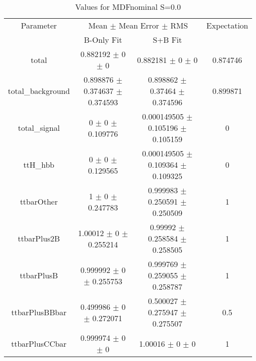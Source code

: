 \begin{table}
\centering
\caption{Values for MDFnominal S=0.0}
\begin{tabular}{cccc}
\toprule
Parameter & \multicolumn{2}{c}{Mean $\pm$ Mean Error $\pm$ RMS} & Expectation\\
 & B-Only Fit & S+B Fit & \\
\midrule
total & \num{0.882192} $\pm$ \num{0} $\pm$ \num{0} & \num{0.882181} $\pm$ \num{0} $\pm$ \num{0} & \num{0.874746}\\
total\_background & \num{0.898876} $\pm$ \num{0.374637} $\pm$ \num{0.374593} & \num{0.898862} $\pm$ \num{0.37464} $\pm$ \num{0.374596} & \num{0.899871}\\
total\_signal & \num{0} $\pm$ \num{0} $\pm$ \num{0.109776} & \num{0.000149505} $\pm$ \num{0.105196} $\pm$ \num{0.105159} & \num{0}\\
ttH\_hbb & \num{0} $\pm$ \num{0} $\pm$ \num{0.129565} & \num{0.000149505} $\pm$ \num{0.109364} $\pm$ \num{0.109325} & \num{0}\\
ttbarOther & \num{1} $\pm$ \num{0} $\pm$ \num{0.247783} & \num{0.999983} $\pm$ \num{0.250591} $\pm$ \num{0.250509} & \num{1}\\
ttbarPlus2B & \num{1.00012} $\pm$ \num{0} $\pm$ \num{0.255214} & \num{0.99992} $\pm$ \num{0.258584} $\pm$ \num{0.258505} & \num{1}\\
ttbarPlusB & \num{0.999992} $\pm$ \num{0} $\pm$ \num{0.255753} & \num{0.999769} $\pm$ \num{0.259055} $\pm$ \num{0.258787} & \num{1}\\
ttbarPlusBBbar & \num{0.499986} $\pm$ \num{0} $\pm$ \num{0.272071} & \num{0.500027} $\pm$ \num{0.275947} $\pm$ \num{0.275507} & \num{0.5}\\
ttbarPlusCCbar & \num{0.999974} $\pm$ \num{0} $\pm$ \num{0} & \num{1.00016} $\pm$ \num{0} $\pm$ \num{0} & \num{1}\\
\bottomrule
\end{tabular}
\end{table}